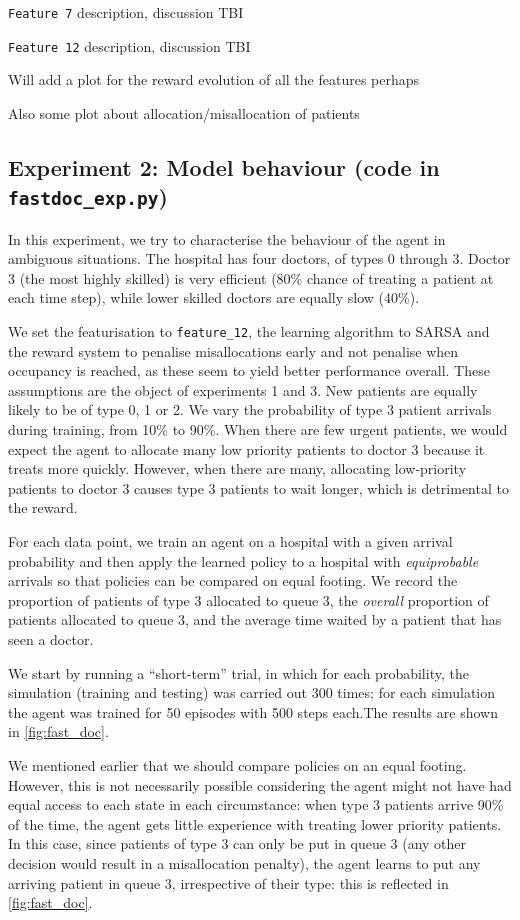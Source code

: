 \documentclass[11point]{article}
\begin{document}
\texttt{Feature 7} description, discussion TBI

\texttt{Feature 12} description, discussion TBI

Will add a plot for the reward evolution of all the features perhaps

Also some plot about allocation/misallocation of patients


\subsection{Experiment 2: Model behaviour (code in \texttt{fastdoc\_exp.py})}
In this experiment, we try to characterise the behaviour of the agent in ambiguous situations.
The hospital has four doctors, of types 0 through 3. Doctor 3 (the most highly skilled) is very efficient (80\% chance of treating a patient at each time step), while lower skilled doctors are equally slow (40\%).

We set the featurisation to \texttt{feature\_12}, the learning algorithm to SARSA and the reward system to penalise misallocations early and not penalise when occupancy is reached, as these seem to yield better performance overall. These assumptions are the object of experiments 1 and 3.
New patients are equally likely to be of type 0, 1 or 2. 
We vary the probability of type 3 patient arrivals during training, from 10\% to 90\%.
When there are few urgent patients, we would expect the agent to allocate many low priority patients to doctor 3 because it treats more quickly. However, when there are many, allocating low-priority patients to doctor 3 causes type 3 patients to wait longer, which is detrimental to the reward.

For each data point, we train an agent on a hospital with a given arrival probability and then apply the learned policy to a hospital with \emph{equiprobable} arrivals so that policies can be compared on equal footing. 
We record the proportion of patients of type 3 allocated to queue 3, the \emph{overall} proportion of patients allocated to queue 3, and the average time waited by a patient that has seen a doctor.

We start by running a ``short-term'' trial, in which for each probability, the simulation (training and testing) was carried out 300 times; for each simulation the agent was trained for 50 episodes with 500 steps each.The results are shown in \autoref{fig:fast_doc}.

We mentioned earlier that we should compare policies on an equal footing. However, this is not necessarily possible considering the agent might not have had equal access to each state in each circumstance: when type 3 patients arrive 90\% of the time, the agent gets little experience with treating lower priority patients.
In this case, since patients of type 3 can only be put in queue 3 (any other decision would result in a misallocation penalty), the agent learns to put any arriving patient in queue 3, irrespective of their type: this is reflected in \autoref{fig:fast_doc}.
\end{document}
